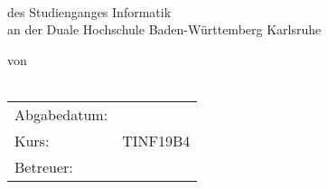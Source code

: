 \begin{titlepage}
	\sffamily
	
	\logodhbw \hfill \\[2ex]
	
	\begin{center}
		\huge{\textsc{\textbf{\theTitle}}}
		\\[6ex]
		\Large{\textbf{\theSubtitle}}
		\\
		\Large{des Studienganges Informatik}
		\\
		\Large{an der Duale Hochschule Baden-Württemberg Karlsruhe}
		\\[7ex]
		
		\normalsize{
			von
			\\
			\theAuthor
			\\[15ex]
			
			\begin{tabular}{ll}
				Abgabedatum:		& \quad \deadline \\
				Kurs:				& \quad TINF19B4 \\ 
				Betreuer:			& \quad \supervisor \\
			\end{tabular}
		}
	\end{center}
\end{titlepage}
